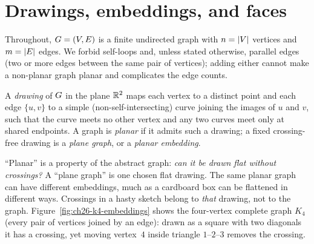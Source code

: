 \chapterline

\section{Drawings, embeddings, and faces}
\label{ch26:setup}

Throughout, $G=(V,E)$ is a finite undirected graph with $n=\lvert V\rvert$ vertices and
$m=\lvert E\rvert$ edges. We forbid self-loops and, unless stated otherwise, parallel edges (two
or more edges between the same pair of vertices); adding either cannot make a non-planar
graph planar and complicates the edge counts.

\begin{definition}
\label{ch26:def-drawing}
A \emph{drawing} of $G$ in the plane $\mathbb{R}^2$ maps each vertex to a distinct point and
each edge $\{u,v\}$ to a simple (non-self-intersecting) curve joining the images of $u$
and $v$, such that the curve meets no other vertex and any two curves meet only at
shared endpoints. A graph is \emph{planar} if it admits such a drawing; a fixed crossing-free
drawing is a \emph{plane graph}, or a \emph{planar embedding}.
\end{definition}

\begin{intuitionbox}
``Planar'' is a property of the abstract graph: \emph{can it be drawn flat without
crossings?} A ``plane graph'' is one chosen flat drawing. The same planar graph can have
different embeddings, much as a cardboard box can be flattened in different ways. Crossings
in a hasty sketch belong to \emph{that} drawing, not to the graph. Figure~\ref{fig:ch26-k4-embeddings}
shows the four-vertex complete graph $K_4$ (every pair of vertices joined by an edge): drawn
as a square with two diagonals it has a crossing, yet moving vertex~$4$ inside triangle
$1\text{--}2\text{--}3$ removes the crossing.
\end{intuitionbox}

